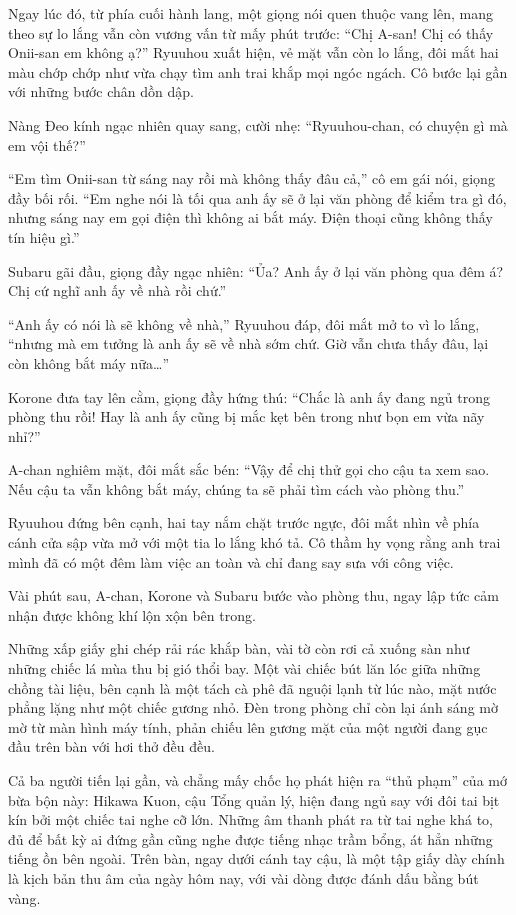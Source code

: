 \documentclass[../main.tex]{subfiles}
\begin{document}
Ngay lúc đó, từ phía cuối hành lang, một giọng nói quen thuộc vang lên, mang theo sự lo lắng vẫn còn vương vấn từ mấy phút trước: ``Chị A-san! Chị có thấy Onii-san em không ạ?'' Ryuuhou xuất hiện, vẻ mặt vẫn còn lo lắng, đôi mắt hai màu chớp chớp như vừa chạy tìm anh trai khắp mọi ngóc ngách. Cô bước lại gần với những bước chân dồn dập.

Nàng Đeo kính ngạc nhiên quay sang, cười nhẹ: ``Ryuuhou-chan, có chuyện gì mà em vội thế?''

``Em tìm Onii-san từ sáng nay rồi mà không thấy đâu cả,'' cô em gái nói, giọng đầy bối rối. ``Em nghe nói là tối qua anh ấy sẽ ở lại văn phòng để kiểm tra gì đó, nhưng sáng nay em gọi điện thì không ai bắt máy. Điện thoại cũng không thấy tín hiệu gì.''

Subaru gãi đầu, giọng đầy ngạc nhiên: ``Ủa? Anh ấy ở lại văn phòng qua đêm á? Chị cứ nghĩ anh ấy về nhà rồi chứ.''

``Anh ấy có nói là sẽ không về nhà,'' Ryuuhou đáp, đôi mắt mở to vì lo lắng, ``nhưng mà em tưởng là anh ấy sẽ về nhà sớm chứ. Giờ vẫn chưa thấy đâu, lại còn không bắt máy nữa\dots''

Korone đưa tay lên cằm, giọng đầy hứng thú: ``Chắc là anh ấy đang ngủ trong phòng thu rồi! Hay là anh ấy cũng bị mắc kẹt bên trong như bọn em vừa nãy nhỉ?''

A-chan nghiêm mặt, đôi mắt sắc bén: ``Vậy để chị thử gọi cho cậu ta xem sao. Nếu cậu ta vẫn không bắt máy, chúng ta sẽ phải tìm cách vào phòng thu.''

Ryuuhou đứng bên cạnh, hai tay nắm chặt trước ngực, đôi mắt nhìn về phía cánh cửa sập vừa mở với một tia lo lắng khó tả. Cô thầm hy vọng rằng anh trai mình đã có một đêm làm việc an toàn và chỉ đang say sưa với công việc.

\omk

Vài phút sau, A-chan, Korone và Subaru bước vào phòng thu, ngay lập tức cảm nhận được không khí lộn xộn bên trong.

Những xấp giấy ghi chép rải rác khắp bàn, vài tờ còn rơi cả xuống sàn như những chiếc lá mùa thu bị gió thổi bay. Một vài chiếc bút lăn lóc giữa những chồng tài liệu, bên cạnh là một tách cà phê đã nguội lạnh từ lúc nào, mặt nước phẳng lặng như một chiếc gương nhỏ. Đèn trong phòng chỉ còn lại ánh sáng mờ mờ từ màn hình máy tính, phản chiếu lên gương mặt của một người đang gục đầu trên bàn với hơi thở đều đều.

Cả ba người tiến lại gần, và chẳng mấy chốc họ phát hiện ra ``thủ phạm'' của mớ bừa bộn này: Hikawa Kuon, cậu Tổng quản lý, hiện đang ngủ say với đôi tai bịt kín bởi một chiếc tai nghe cỡ lớn. Những âm thanh phát ra từ tai nghe khá to, đủ để bất kỳ ai đứng gần cũng nghe được tiếng nhạc trầm bổng, át hẳn những tiếng ồn bên ngoài. Trên bàn, ngay dưới cánh tay cậu, là một tập giấy dày chính là kịch bản thu âm của ngày hôm nay, với vài dòng được đánh dấu bằng bút vàng.
\end{document}
